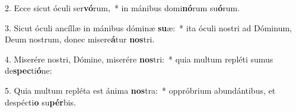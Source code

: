 2. Ecce sicut óculi ser\textbf{vó}rum,~*  in mánibus domi\textbf{nó}rum su\textbf{ó}rum.\

3. Sicut óculi ancíllæ in mánibus dóminæ \textbf{su}æ:~*  ita óculi nostri ad Dóminum, Deum nostrum, donec misere\textbf{á}tur \textbf{nos}tri.\

4. Miserére nostri, Dómine, miserére \textbf{nos}tri:~*  quia multum repléti sumus de\textbf{spec}ti\textbf{ó}ne:\

5. Quia multum repléta est ánima \textbf{nos}tra:~*  oppróbrium abundántibus, et despécti\textbf{o} su\textbf{pér}bis.\

